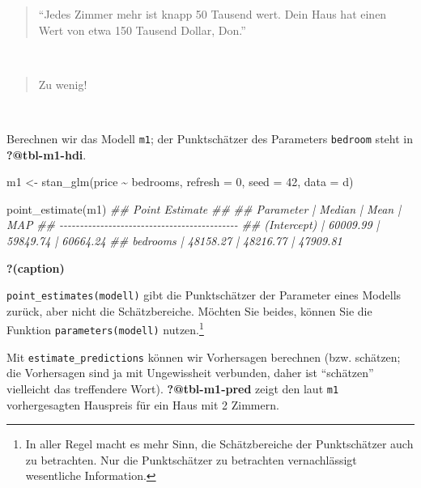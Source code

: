 \documentclass[
  a4paper,
  DIV=11]{scrreprt}
\newenvironment{Shaded}{\begin{snugshade}}{\end{snugshade}}
\newcommand{\AttributeTok}[1]{\textcolor[rgb]{0.40,0.45,0.13}{#1}}
\newcommand{\DecValTok}[1]{\textcolor[rgb]{0.68,0.00,0.00}{#1}}
\newcommand{\DocumentationTok}[1]{\textcolor[rgb]{0.37,0.37,0.37}{\textit{#1}}}
\newcommand{\FunctionTok}[1]{\textcolor[rgb]{0.28,0.35,0.67}{#1}}
\newcommand{\NormalTok}[1]{\textcolor[rgb]{0.00,0.23,0.31}{#1}}
\newcommand{\OtherTok}[1]{\textcolor[rgb]{0.00,0.23,0.31}{#1}}
\newcommand{\SpecialCharTok}[1]{\textcolor[rgb]{0.37,0.37,0.37}{#1}}
\theoremstyle{definition}
\theoremstyle{remark}
\begin{document}
\begin{quote}
``Jedes Zimmer mehr ist knapp 50 Tausend wert. Dein Haus hat einen Wert
von etwa 150 Tausend Dollar, Don.''
\end{quote}

👩

\begin{quote}
Zu wenig! 🤬
\end{quote}

🧑

Berechnen wir das Modell \texttt{m1}; der Punktschätzer des Parameters
\texttt{bedroom} steht in \textbf{?@tbl-m1-hdi}.

\begin{Shaded}
\begin{Highlighting}[]
\NormalTok{m1 }\OtherTok{\textless{}{-}} \FunctionTok{stan\_glm}\NormalTok{(price }\SpecialCharTok{\textasciitilde{}}\NormalTok{ bedrooms,}
               \AttributeTok{refresh =} \DecValTok{0}\NormalTok{,}
               \AttributeTok{seed =} \DecValTok{42}\NormalTok{,}
               \AttributeTok{data =}\NormalTok{ d)}

\FunctionTok{point\_estimate}\NormalTok{(m1)}
\DocumentationTok{\#\# Point Estimate}
\DocumentationTok{\#\# }
\DocumentationTok{\#\# Parameter   |   Median |     Mean |      MAP}
\DocumentationTok{\#\# {-}{-}{-}{-}{-}{-}{-}{-}{-}{-}{-}{-}{-}{-}{-}{-}{-}{-}{-}{-}{-}{-}{-}{-}{-}{-}{-}{-}{-}{-}{-}{-}{-}{-}{-}{-}{-}{-}{-}{-}{-}{-}{-}{-}}
\DocumentationTok{\#\# (Intercept) | 60009.99 | 59849.74 | 60664.24}
\DocumentationTok{\#\# bedrooms    | 48158.27 | 48216.77 | 47909.81}
\end{Highlighting}
\end{Shaded}

\begin{table}

\caption{\textbf{?(caption)}}

\end{table}

\texttt{point\_estimates(modell)} gibt die Punktschätzer der Parameter
eines Modells zurück, aber nicht die Schätzbereiche. Möchten Sie beides,
können Sie die Funktion \texttt{parameters(modell)} nutzen.\footnote{In
  aller Regel macht es mehr Sinn, die Schätzbereiche der Punktschätzer
  auch zu betrachten. Nur die Punktschätzer zu betrachten vernachlässigt
  wesentliche Information.}

Mit \texttt{estimate\_predictions} können wir Vorhersagen berechnen
(bzw. schätzen; die Vorhersagen sind ja mit Ungewissheit verbunden,
daher ist ``schätzen'' vielleicht das treffendere Wort).
\textbf{?@tbl-m1-pred} zeigt den laut \texttt{m1} vorhergesagten
Hauspreis für ein Haus mit 2 Zimmern.
\end{document}
